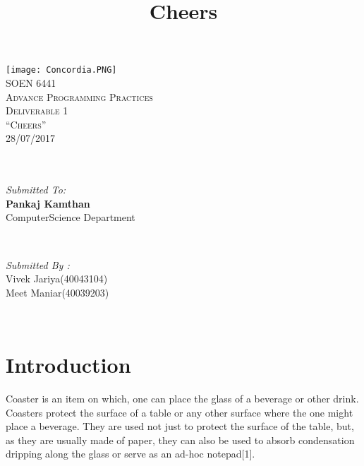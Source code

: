 \documentclass[11pt]{article}
\begin{document}
\begin{titlepage}
	\centering
	\vspace*{0.5 cm}
	\texttt{[image: Concordia.PNG]}\\[1.0 cm]	%
	\textsc{\LARGE SOEN 6441}\\[1.0 cm]	%
	\textsc{\LARGE Advance Programming Practices}\\[1.0 cm] %
	\textsc{\LARGE Deliverable 1}\\[1.0 cm]
	\textsc{\Large “Cheers”}\\[0.5 cm]	%
	\textsc{\Large 28/07/2017}\\[0.5 cm]		
	\textsc{\LARGE }\\[1.0 cm]
	\textsc{\LARGE }\\[1.0 cm]
	\begin{minipage}{0.4\textwidth}
		\begin{flushleft} \large
			\emph{Submitted To:}\\
			\textbf{Pankaj Kamthan}\\
		ComputerScience Department\\
		\end{flushleft}
	\end{minipage}~
	\begin{minipage}{0.4\textwidth}
		
		\begin{flushright} \large
			
			\emph{Submitted By :} \\
			Vivek Jariya(40043104)\\
			Meet Maniar(40039203) \\
			
		\end{flushright}
		
	\end{minipage}\\[1 cm]
		
\end{titlepage}

\tableofcontents
	
\title{Cheers}

\newpage
\section{Introduction}

		Coaster is an item on which, one can place the glass of a beverage or other drink. Coasters protect the surface of a table or any other surface where the one might place a beverage. They are used not just to protect the surface of the table, but, as they are usually made of paper, they can also be used to absorb condensation dripping along the glass or serve as an ad-hoc notepad[1].
		
\end{document}
